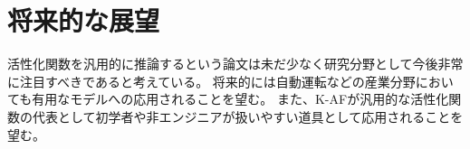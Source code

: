 \section{将来的な展望}

活性化関数を汎用的に推論するという論文は未だ少なく研究分野として今後非常に注目すべきであると考えている。 
将来的には自動運転などの産業分野においても有用なモデルへの応用されることを望む。
また、K-AFが汎用的な活性化関数の代表として初学者や非エンジニアが扱いやすい道具として応用されることを望む。


